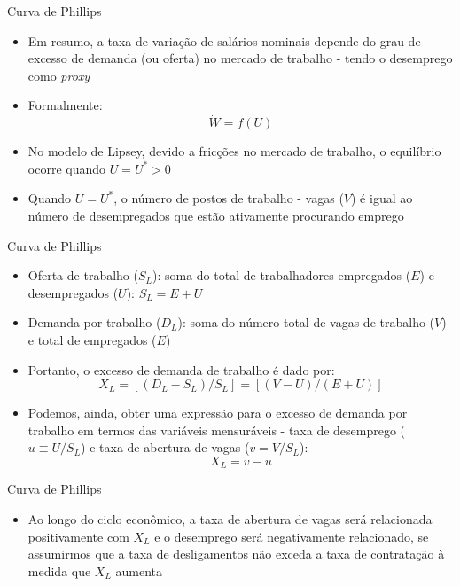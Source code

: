 \documentclass[10pt]{beamer}
\begin{document}
\begin{frame}{Curva de Phillips}
    \begin{itemize}
        \item Em resumo, a taxa de variação de salários nominais depende do grau de excesso de demanda (ou oferta) no mercado de trabalho - tendo o desemprego como \emph{proxy}
        \bigskip
        \item Formalmente:
        \begin{equation}
            \dot{W} = f(U)
            \label{eq6}
        \end{equation}
        \bigskip
        \item No modelo de Lipsey, devido a fricções no mercado de trabalho, o equilíbrio ocorre quando $U = U^*>0$
        \bigskip
        \item Quando $U = U^*$, o número de postos de trabalho - vagas ($V$) é igual ao número de desempregados que estão ativamente procurando emprego
    \end{itemize}
\end{frame}

\begin{frame}{Curva de Phillips}
    \begin{itemize}
        \item Oferta de trabalho ($S_L$): soma do total de trabalhadores empregados ($E$) e desempregados ($U$): $S_L = E + U$
        \bigskip
        \item Demanda por trabalho ($D_L$): soma do número total de vagas de trabalho ($V$) e total de empregados ($E$)
        \bigskip
        \item Portanto, o excesso de demanda de trabalho é dado por:
        \begin{equation}
            X_L = [(D_L - S_L)/S_L] = [(V-U)/(E + U)]
            \label{eq7}
        \end{equation}
        \bigskip
        \item Podemos, ainda, obter uma expressão para o excesso de demanda por trabalho em termos das variáveis mensuráveis - taxa de desemprego ($u\equiv U/S_L$) e taxa de abertura de vagas ($v = V/S_L$):
        \begin{equation}
            X_L = v - u
            \label{eq8}
        \end{equation}
    \end{itemize}
\end{frame}

\begin{frame}{Curva de Phillips}
    \begin{itemize}
        \item Ao longo do ciclo econômico, a taxa de abertura de vagas será relacionada positivamente com $X_L$ e o desemprego será negativamente relacionado, se assumirmos que a taxa de desligamentos não exceda a taxa de contratação à medida que $X_L$ aumenta
    \end{itemize}
\end{frame}
\end{document}
